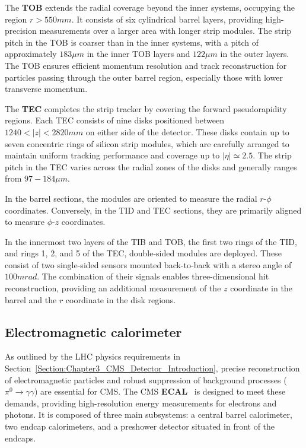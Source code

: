 The \textbf{TOB} extends the radial coverage beyond the inner systems, occupying the region $r > 550\unit{mm}$. It consists of six cylindrical barrel layers, providing high-precision measurements over a larger area with longer strip modules. The strip pitch in the TOB is coarser than in the inner systems, with a pitch of approximately $183\unit{\mu m}$ in the inner TOB layers and $122\unit{\mu m}$ in the outer layers. The TOB ensures efficient momentum resolution and track reconstruction for particles passing through the outer barrel region, especially those with lower transverse momentum.

The \textbf{TEC} completes the strip tracker by covering the forward pseudorapidity regions. Each TEC consists of nine disks positioned between $1240 < |z| < 2820\unit{mm}$ on either side of the detector. These disks contain up to seven concentric rings of silicon strip modules, which are carefully arranged to maintain uniform tracking performance and coverage up to $|\eta| \simeq 2.5$. The strip pitch in the TEC varies across the radial zones of the disks and generally ranges from $97-184\unit{\mu m}$.

In the barrel sections, the modules are oriented to measure the radial $r\text{-}\phi$ coordinates. Conversely, in the TID and TEC sections, they are primarily aligned to measure $\phi\text{-}z$ coordinates.

In the innermost two layers of the TIB and TOB, the first two rings of the TID, and rings 1, 2, and 5 of the TEC, double-sided modules are deployed. These consist of two single-sided sensors mounted back-to-back with a stereo angle of $100\unit{mrad}$. The combination of their signals enables three-dimensional hit reconstruction, providing an additional measurement of the $z$ coordinate in the barrel and the $r$ coordinate in the disk regions.

\subsection{Electromagnetic calorimeter}

As outlined by the LHC physics requirements in Section~\ref{Section:Chapter3_CMS_Detector_Introduction}, precise reconstruction of electromagnetic particles and robust suppression of background processes ($\pi^0 \to \gamma \gamma$) are essential for CMS. The CMS \textbf{ECAL}~\cite{LHC_CMS,CMS_Detector_Run3,CMS_ECAL_Performance_Run2} is designed to meet these demands, providing high-resolution energy measurements for electrons and photons. It is composed of three main subsystems: a central barrel calorimeter, two endcap calorimeters, and a preshower detector situated in front of the endcaps.

